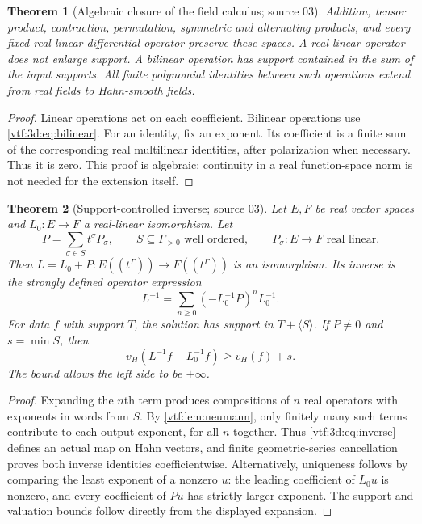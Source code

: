 \documentclass[11pt,letterpaper]{article}
\newtheorem{theorem}{Theorem}[section]
\theoremstyle{definition}
\theoremstyle{remark}
\newcommand{\vH}{v_{\!H}}
\begin{document}
\begin{theorem}[Algebraic closure of the field calculus; source 03]\label{vtf:3d:thm:closure}
Addition, tensor product, contraction, permutation, symmetric and alternating products, and every fixed real-linear differential operator preserve these spaces. A real-linear operator does not enlarge support. A bilinear operation has support contained in the sum of the input supports. All finite polynomial identities between such operations extend from real fields to Hahn-smooth fields.
\end{theorem}
\begin{proof}
Linear operations act on each coefficient. Bilinear operations use \eqref{vtf:3d:eq:bilinear}. For an identity, fix an exponent. Its coefficient is a finite sum of the corresponding real multilinear identities, after polarization when necessary. Thus it is zero. This proof is algebraic; continuity in a real function-space norm is not needed for the extension itself.
\end{proof}

\begin{theorem}[Support-controlled inverse; source 03]\label{vtf:3d:thm:inverse}
Let $E,F$ be real vector spaces and $L_0:E\to F$ a real-linear isomorphism. Let
\[
 P=\sum_{\sigma\in S}t^\sigma P_\sigma,
 \qquad S\subseteq\Gamma_{>0}\text{ well ordered},
 \qquad P_\sigma:E\to F\text{ real linear}.
\]
Then $L=L_0+P:E((t^\Gamma))\to F((t^\Gamma))$ is an isomorphism. Its inverse is the strongly defined operator expression
\begin{equation}\label{vtf:3d:eq:inverse}
 L^{-1}=\sum_{n\geq0}(-L_0^{-1}P)^nL_0^{-1}.
\end{equation}
For data $f$ with support $T$, the solution has support in
$T+\langle S\rangle$. If $P\ne0$ and $s=\min S$, then
\[
 \vH(L^{-1}f-L_0^{-1}f)\geq \vH(f)+s.
\]
The bound allows the left side to be $+\infty$.
\end{theorem}
\begin{proof}
Expanding the $n$th term produces compositions of $n$ real operators with exponents in words from $S$. By \cref{vtf:lem:neumann}, only finitely many such terms contribute to each output exponent, for all $n$ together. Thus \eqref{vtf:3d:eq:inverse} defines an actual map on Hahn vectors, and finite geometric-series cancellation proves both inverse identities coefficientwise. Alternatively, uniqueness follows by comparing the least exponent of a nonzero $u$: the leading coefficient of $L_0u$ is nonzero, and every coefficient of $Pu$ has strictly larger exponent. The support and valuation bounds follow directly from the displayed expansion.
\end{proof}
\end{document}
